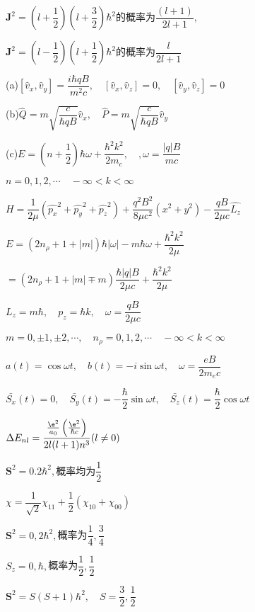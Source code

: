 		$ \boldsymbol{J}^{2}=\left(l+\dfrac{1}{2}\right)\left(l+\dfrac{3}{2}\right)\hbar^{2}$的概率为$\dfrac{(l+1)}{2l+1}, $
		
		$ \boldsymbol{J}^{2}=\left(l-\dfrac{1}{2}\right)\left(l+\dfrac{1}{2}\right)\hbar^{2}$的概率为$\dfrac{l}{2l+1} $

\answer (a)$ [\hat{v}_{x},\hat{v}_{y}]=\dfrac{i\hbar qB}{m^{2}c},\quad [\hat{v}_{x},\hat{v}_{z}]=0,\quad [\hat{v}_{y},\hat{v}_{z}]=0 $

		(b)$ \hat{Q}=m\sqrt{\dfrac{c}{\hbar qB}}\hat{v}_{x},\quad \hat{P}=m\sqrt{\dfrac{c}{\hbar qB}}\hat{v}_{y} $
		
		(c)$ E=\left(n+\dfrac{1}{2}\right)\hbar\omega+\dfrac{\hbar^{2}k^{2}}{2m_{c}},\quad, \omega=\dfrac{|q|B}{mc} $
		
\aindent$ n=0,1,2,\cdots\quad -\infty<k<\infty $

\answer $ H=\dfrac{1}{2\mu}(\hat{p_{x}}^{2}+\hat{p_{y}}^{2}+\hat{p_{z}}^{2})+\dfrac{q^{2}B^{2}}{8\mu c^{2}}(x^{2}+y^{2})-\dfrac{qB}{2\mu c}\hat{L_{z}} $

		$ E=(2n_{\rho}+1+|m|)\hbar|\omega|-m\hbar\omega+\dfrac{\hbar^{2}k^{2}}{2\mu} $
		
\aindent$ =(2n_{\rho}+1+|m|\mp m)\dfrac{\hbar|q|B}{2\mu c}+\dfrac{\hbar^{2}k^{2}}{2\mu} $
		
		$ L_{z}=m\hbar,\quad p_{z}=\hbar k,\quad \omega=\dfrac{qB}{2\mu c} $
		
		$ m=0,\pm1,\pm2,\cdots,\quad n_{\rho}=0,1,2,\cdots\quad -\infty<k<\infty $

\answer $ a(t)=\cos\omega t,\quad b(t)=-i\sin\omega t,\quad \omega=\dfrac{eB}{2m_{e}c} $

		$ \bar{S_{x}}(t)=0,\quad \bar{S_{y}}(t)=-\dfrac{\hbar}{2}\sin\omega t,\quad \bar{S_{z}}(t)=\dfrac{\hbar}{2}\cos\omega t $


\answer $ \Delta E_{nl}=\dfrac{ \frac{\e^{2}}{a_{0}}\left(\frac{\e^{2}}{\hbar c}\right) }{2l(l+1)n^{3}}(l\neq0) $

\answer $ \boldsymbol{S}^{2}=0.2\hbar^{2}, $概率均为$\dfrac{1}{2}$

\answer $ \chi=\dfrac{1}{\sqrt{2}}\chi_{11}+\dfrac{1}{2}(\chi_{10}+\chi_{00}) $

		$ \boldsymbol{S}^{2}=0,2\hbar^{2}, $概率为$\dfrac{1}{4},\dfrac{3}{4}$
		
		$ S_{z}=0,\hbar, $概率为$\dfrac{1}{2},\dfrac{1}{2}$

\answer $ \boldsymbol{S}^{2}=S(S+1)\hbar^{2},\quad S=\dfrac{3}{2},\dfrac{1}{2} $

